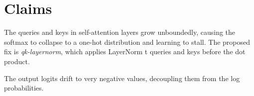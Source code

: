 \documentclass[12pt,a4paper]{article}
\newcommand{\important}[1]{\textbf{\color{midblue}#1}}
\begin{document}
\section{Claims}

\begin{tcolorbox}[
  colback=lightblue,
  colframe=midblue,
  boxrule=0.8pt,
  arc=4pt,
  title=\textbf{Claim 1}
]
\small
The queries and keys in self-attention layers grow unboundedly, causing the softmax to collapse to a one-hot distribution and learning to stall. The proposed fix is \emph{qk-layernorm}, which applies LayerNorm t queries and keys before the dot product.
\end{tcolorbox}
\begin{tcolorbox}[
  colback=accentyellow,
  colframe=accentorange,
  boxrule=0.8pt,
  arc=4pt,
  title=\textbf{Claim 2}
]
\small
The output logits drift to very negative values, decoupling them from the log probabilities.
\end{tcolorbox}
\newpage






\end{document}
